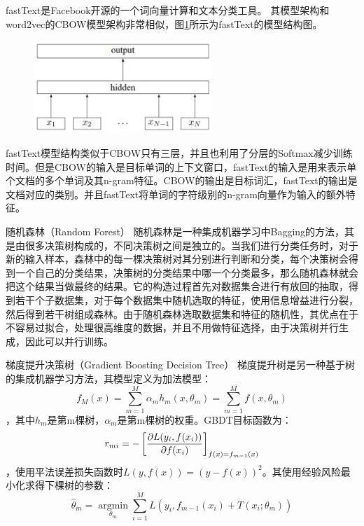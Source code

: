 fastText\cite{joulin2016bag}是Facebook开源的一个词向量计算和文本分类工具。
其模型架构和word2vec\cite{mikolov2013distributed}的CBOW模型架构非常相似，图\ref{fig:fasttext}所示为fastText的模型结构图。
\begin{figure}[htb]
    \centering
    \includegraphics[width=0.6\textwidth]{Img/fastText.png}
    \label{fig:fasttext}
\end{figure}
fastText模型结构类似于CBOW只有三层，并且也利用了分层的Softmax减少训练时间。但是CBOW的输入是目标单词的上下文窗口，fastText的输入是用来表示单个文档的多个单词及其n-gram特征。CBOW的输出是目标词汇，fastText的输出是文档对应的类别。并且fastText将单词的字符级别的n-gram向量作为输入的额外特征。

随机森林（Random Forest）\cite{liaw2002classification}
随机森林是一种集成机器学习中Bagging的方法，其是由很多决策树构成的，不同决策树之间是独立的。当我们进行分类任务时，对于新的输入样本，森林中的每一棵决策树对其分别进行判断和分类，每个决策树会得到一个自己的分类结果，决策树的分类结果中哪一个分类最多，那么随机森林就会把这个结果当做最终的结果。它的构造过程首先对数据集合进行有放回的抽取，得到若干个子数据集，对于每个数据集中随机选取的特征，使用信息增益进行分裂，然后得到若干树组成森林。由于随机森林选取数据集和特征的随机性，其优点在于不容易过拟合，处理很高维度的数据，并且不用做特征选择，由于决策树并行生成，因此可以并行训练。

梯度提升决策树（Gradient Boosting Decision Tree）\cite{ke2017lightgbm}
梯度提升树是另一种基于树的集成机器学习方法，其模型定义为加法模型：
$$f_M(x)=\sum^M_{m=1}\alpha_mh_m(x,\theta_m)=\sum^M_{m=1}f(x,\theta_m)$$，其中$h_m$是第m棵树，$\alpha_m$是第m棵树的权重。GBDT目标函数为：
$$\large {r_{mi}} = -\left[\frac{\partial L(y_i,f(x_i))}{\partial f(x_i)} \right]_{f(x)=f_{m-1}(x)}$$，使用平法误差损失函数时$L(y, f(x)) = (y-f(x))^2$。其使用经验风险最小化求得下棵树的参数：
$$\hat \theta_{m} = \mathop{\arg\min}\limits_{\theta_{m}} \sum_{i=1}^ML(y_{i}, f_{m-1}(x_{i})+T(x_{i}; \theta_{m}))$$

